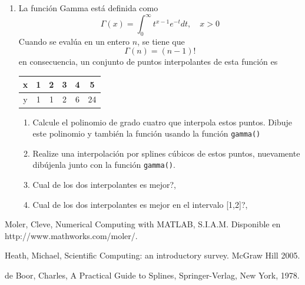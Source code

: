 \documentclass[11pt]{article}
\begin{document}
\begin{enumerate}
\item La funci\'on Gamma est\'a definida como
$$
\Gamma(x)=\int_0^\infty t^{x-1}e^{-t}dt, \quad x>0
$$
Cuando se eval\'ua en un entero $n$, se tiene que 
$$
\Gamma(n)=(n-1)!
$$
en consecuencia, un conjunto de puntos interpolantes de esta funci\'on es 
\begin{center}
\begin{tabular}{c|ccccc}
x 	& 1 & 2	& 3 & 4 & 5 \\
\hline
y	& 1	& 1 & 2 & 6 & 24
\end{tabular}
\end{center}
\begin{enumerate}
\item Calcule el polinomio de grado cuatro que interpola estos puntos. Dibuje este polinomio y tambi\' en la funci\'on usando la funci\'on \texttt{gamma()}
\item Realize una interpolaci\'on por splines c\'ubicos de estos puntos, nuevamente dib\'ujenla junto con la funci\'on \texttt{gamma()}.
\item \textquestiondown Cual de los dos interpolantes es mejor?,
\item \textquestiondown Cual de los dos interpolantes es mejor en el intervalo [1,2]?,
\end{enumerate}



\end{enumerate}

\begin{thebibliography}{9}


 Moler, Cleve, Numerical Computing with MATLAB, S.I.A.M. Disponible en http://www.mathworks.com/moler/.

 Heath, Michael, Scientific Computing: an introductory survey. McGraw Hill 2005.

 de Boor, Charles, A Practical Guide to Splines, Springer-Verlag, New York, 1978.


\end{thebibliography}
\end{document}
